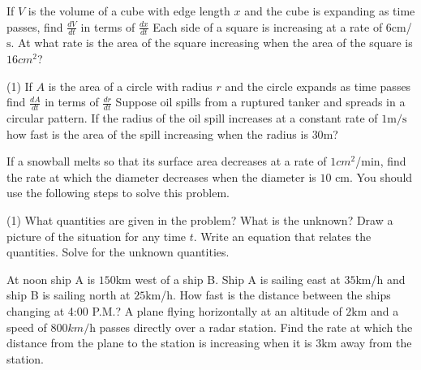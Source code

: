 \begin{Exercise}[title={Rate of Change},label=exRateOfChange]
\begin{Exercise}[title={Parametric Differentiation},label=exParametric]
\end{Exercise}
\begin{Answer}[ref={exParametric}]
	
\end{Answer}%

\begin{Exercise}[title={Related Rates},label=exRelatedRates]
	\Question If $V$ is the volume of a cube with edge length $x$ and the cube is expanding as time passes, find $\frac{d V}{d t}$ in terms of $\frac{d x}{d t}$ %
	\Question Each side of a square is increasing at a rate of $6 \mbox{cm}$/$\mbox{s}$. At what rate is the area of	the square increasing when the area of the square is $16 cm^{2}$?  %
	\Question 
	\begin{tasks}(1)
		\task  If $A$ is the area of a circle with radius $r$ and the circle expands as time passes find $\frac{d A}{d t}$ in terms of $\frac{d r}{d t}$ %
		\task  Suppose oil spills from a ruptured tanker and spreads in a circular pattern. If the radius of the oil spill increases at a constant rate of $1 \mathrm{m}/\mbox{s}$ how fast is the area of the spill increasing when the radius is $30 \mbox{m}$? %
	\end{tasks}
	
	\Question If a snowball melts so that its surface area decreases at a rate of $1 cm^{2}$/$\mbox{min}$, find the rate at which the diameter decreases when the diameter is $10$ $\mbox{cm}$. You should use the following steps to solve this problem. %
	\begin{tasks}[style=enumerate](1)
		\task What quantities are given in the problem? 
		\task What is the unknown?
		\task Draw a picture of the situation for any time $t$. 
		\task Write an equation that relates the quantities. 
		\task Solve for the unknown quantities.		
	\end{tasks}
	\Question At noon ship A is $150 \mbox{km}$ west of a ship B. Ship A is sailing east at $35 \mbox{km}$/$\mbox{h}$ and ship B is sailing north at $25 \mbox{km}$/$\mbox{h}$. How fast is the distance between the ships changing at 4:00 P.M.? %
	\Question A plane flying horizontally at an altitude of $2 \mbox{km}$ and a speed of $800 km/\mbox{h}$ passes directly over a radar station. Find the rate at which the distance from the plane to the station is increasing when it is $3 \mbox{km}$ away from the station.%



\end{Exercise}
\end{Exercise}
